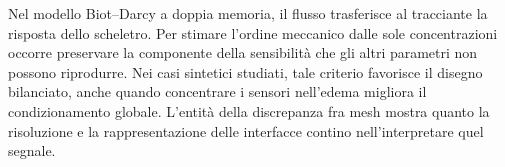 Nel modello Biot--Darcy a doppia memoria, il flusso trasferisce al tracciante la risposta dello scheletro. Per stimare l'ordine meccanico dalle sole concentrazioni occorre preservare la componente della sensibilità che gli altri parametri non possono riprodurre. Nei casi sintetici studiati, tale criterio favorisce il disegno bilanciato, anche quando concentrare i sensori nell'edema migliora il condizionamento globale. L'entità della discrepanza fra mesh mostra quanto la risoluzione e la rappresentazione delle interfacce contino nell'interpretare quel segnale.
